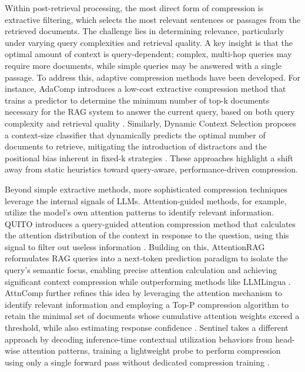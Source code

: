 \documentclass[11pt]{article}
\begin{document}
Within post-retrieval processing, the most direct form of compression is extractive filtering, which selects the most relevant sentences or passages from the retrieved documents. The challenge lies in determining relevance, particularly under varying query complexities and retrieval quality. A key insight is that the optimal amount of context is query-dependent; complex, multi-hop queries may require more documents, while simple queries may be answered with a single passage. To address this, adaptive compression methods have been developed. For instance, AdaComp introduces a low-cost extractive compression method that trains a predictor to determine the minimum number of top-k documents necessary for the RAG system to answer the current query, based on both query complexity and retrieval quality \cite{ref154}. Similarly, Dynamic Context Selection proposes a context-size classifier that dynamically predicts the optimal number of documents to retrieve, mitigating the introduction of distractors and the positional bias inherent in fixed-k strategies \cite{ref155}. These approaches highlight a shift away from static heuristics toward query-aware, performance-driven compression.

Beyond simple extractive methods, more sophisticated compression techniques leverage the internal signals of LLMs. Attention-guided methods, for example, utilize the model's own attention patterns to identify relevant information. QUITO introduces a query-guided attention compression method that calculates the attention distribution of the context in response to the question, using this signal to filter out useless information \cite{ref156}. Building on this, AttentionRAG reformulates RAG queries into a next-token prediction paradigm to isolate the query's semantic focus, enabling precise attention calculation and achieving significant context compression while outperforming methods like LLMLingua \cite{ref157}. AttnComp further refines this idea by leveraging the attention mechanism to identify relevant information and employing a Top-P compression algorithm to retain the minimal set of documents whose cumulative attention weights exceed a threshold, while also estimating response confidence \cite{ref158}. Sentinel takes a different approach by decoding inference-time contextual utilization behaviors from head-wise attention patterns, training a lightweight probe to perform compression using only a single forward pass without dedicated compression training \cite{ref159}.
\end{document}
